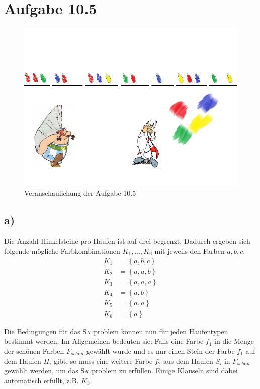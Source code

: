 \documentclass{article}
\begin{document}
\section*{Aufgabe 10.5}
\begin{figure}
  \includegraphics[width=\columnwidth]{hinkelsteine.png}
  \caption{Veranschaulichung der Aufgabe 10.5}
  \label{fig:obelix}
\end{figure}

\subsection*{a)}
Die Anzahl Hinkelsteine pro Haufen ist auf drei begrenzt. Dadurch ergeben sich folgende mögliche Farbkombinationen $K_1,\dots,K_6$ mit jeweils den Farben $a, b, c$:
\begin{align*}
K_1 &= \left\{ a, b, c \right\} \\
K_2 &= \left\{ a, a, b \right\} \\
K_3 &= \left\{ a, a, a \right\} \\
K_4 &= \left\{ a, b \right\} \\
K_5 &= \left\{ a, a \right\} \\
K_6 &= \left\{ a \right\} 
\end{align*}

Die Bedingungen für das \textsc{Sat}problem können nun für jeden Haufentypen bestimmt werden. Im Allgemeinen bedeuten sie: Falls eine Farbe $f_1$ in die Menge der schönen Farben $F_{schön}$ gewählt wurde und es nur einen Stein der Farbe $f_1$ auf dem Haufen $H_i$ gibt, so muss eine weitere Farbe $f_2$ aus dem Haufen $S_i$ in $F_{schön}$ gewählt werden, um das \textsc{Sat}problem zu erfüllen. Einige Klauseln sind dabei automatisch erfüllt, z.B. $K_3$.
\end{document}
